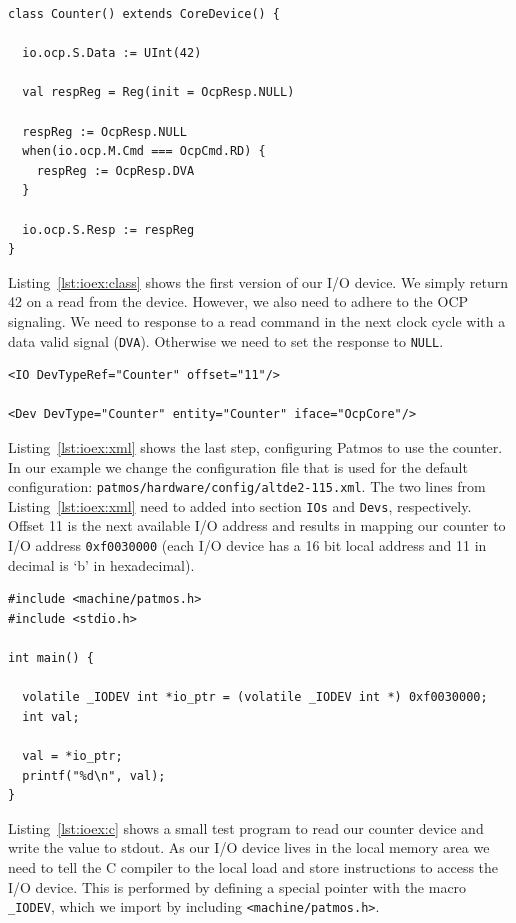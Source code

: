 \documentclass[a4paper,fontsize=10pt,twoside,DIV15,BCOR12mm,headinclude=true,footinclude=false,pagesize,bibtotoc]{scrbook}
\newcommand{\code}[1]{{\texttt{#1}}}
\begin{document}
\begin{lstlisting}[float, caption={Class for the counter device\label{lst:ioex:class}}]
class Counter() extends CoreDevice() {

  io.ocp.S.Data := UInt(42)
  
  val respReg = Reg(init = OcpResp.NULL)
  
  respReg := OcpResp.NULL
  when(io.ocp.M.Cmd === OcpCmd.RD) {
    respReg := OcpResp.DVA
  }
  
  io.ocp.S.Resp := respReg
}
\end{lstlisting}

Listing~\ref{lst:ioex:class} shows the first version of our I/O device.
We simply return 42 on a read from the device. However, we also need to
adhere to the OCP signaling. We need to response to a read command
in the next clock cycle with a data valid signal (\code{DVA}). Otherwise we need to
set the response to \code{NULL}.

\begin{lstlisting}[float, caption={Configuring the processor to include our
counter device\label{lst:ioex:xml}}]
<IO DevTypeRef="Counter" offset="11"/>

<Dev DevType="Counter" entity="Counter" iface="OcpCore"/>
\end{lstlisting}

Listing~\ref{lst:ioex:xml} shows the last step, configuring Patmos to use the
counter. In our example we change the configuration file that is used for
the default configuration: \code{patmos/hardware/config/altde2-115.xml}.
The two lines from Listing~\ref{lst:ioex:xml} need to added into section \code{IOs}
and \code{Devs}, respectively. Offset 11 is the next available I/O address and
results in mapping our counter to I/O address \code{0xf0030000}
(each I/O device has a 16 bit local address and 11 in decimal is `b' in hexadecimal).

\begin{lstlisting}[float, caption={Testing the counter device\label{lst:ioex:c}}]
#include <machine/patmos.h>
#include <stdio.h>

int main() {

  volatile _IODEV int *io_ptr = (volatile _IODEV int *) 0xf0030000;
  int val;

  val = *io_ptr;
  printf("%d\n", val);
}

\end{lstlisting}

Listing~\ref{lst:ioex:c} shows a small test program to read our counter device
and write the value to stdout. As our I/O device lives in the local memory
area we need to tell the C compiler to the local load and store instructions
to access the I/O device. This is performed by defining a special pointer
with the macro \code{\_IODEV}, which we import by including \code{<machine/patmos.h>}.
\end{document}

